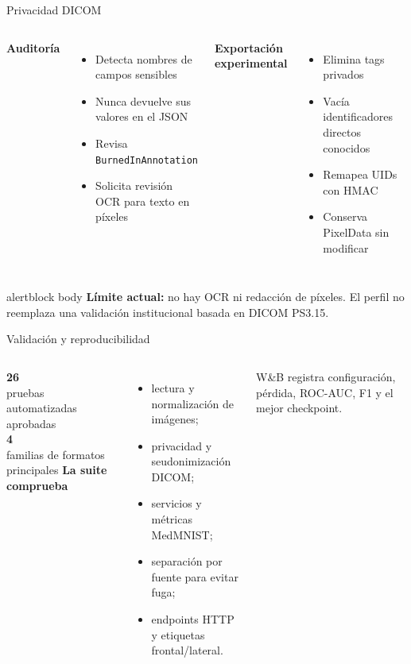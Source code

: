 \documentclass[aspectratio=169,10pt]{beamer}
\begin{document}
\begin{frame}{Privacidad DICOM}
\begin{columns}[T,onlytextwidth]
{\bfseries\color{Navy}Auditoría}
\begin{itemize}
  \item Detecta nombres de campos sensibles
  \item Nunca devuelve sus valores en el JSON
  \item Revisa \texttt{BurnedInAnnotation}
  \item Solicita revisión OCR para texto en píxeles
\end{itemize}
{\bfseries\color{Navy}Exportación experimental}
\begin{itemize}
  \item Elimina tags privados
  \item Vacía identificadores directos conocidos
  \item Remapea UIDs con HMAC
  \item Conserva PixelData sin modificar
\end{itemize}
\end{columns}
\vspace{0.65cm}
\begin{beamercolorbox}[rounded=true,sep=0.35cm]{alertblock body}
{\color{Coral}\bfseries Límite actual:} no hay OCR ni redacción de píxeles. El perfil no reemplaza una validación institucional basada en DICOM PS3.15.
\end{beamercolorbox}
\end{frame}

\begin{frame}{Validación y reproducibilidad}
\begin{columns}[T,onlytextwidth]
{\fontsize{30}{32}\selectfont\color{Blue}\bfseries 26}\\[-0.05cm]
{\large pruebas automatizadas aprobadas}\\[0.65cm]
{\fontsize{24}{27}\selectfont\color{Cyan}\bfseries 4}\\[-0.05cm]
{\large familias de formatos principales}
{\bfseries\color{Navy}La suite comprueba}
\begin{itemize}
  \item lectura y normalización de imágenes;
  \item privacidad y seudonimización DICOM;
  \item servicios y métricas MedMNIST;
  \item separación por fuente para evitar fuga;
  \item endpoints HTTP y etiquetas frontal/lateral.
\end{itemize}
\vspace{0.3cm}
W\&B registra configuración, pérdida, ROC-AUC, F1 y el mejor checkpoint.
\end{columns}
\end{frame}
\end{document}
